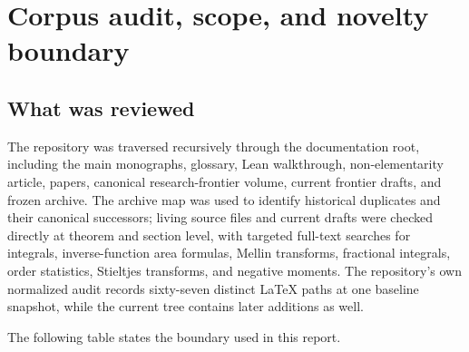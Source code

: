 \documentclass[11pt,oneside]{article}
\theoremstyle{definition}
\theoremstyle{remark}
\newcommand{\1}{\mathbf 1}
\begin{document}
\bigskip

\section{Corpus audit, scope, and novelty boundary}

\subsection{What was reviewed}

The repository was traversed recursively through the documentation root, including the
main monographs, glossary, Lean walkthrough, non-elementarity article, papers, canonical
research-frontier volume, current frontier drafts, and frozen archive.  The archive map
was used to identify historical duplicates and their canonical successors; living source
files and current drafts were checked directly at theorem and section level, with targeted
full-text searches for integrals, inverse-function area formulas, Mellin transforms,
fractional integrals, order statistics, Stieltjes transforms, and negative moments.
The repository's own normalized audit records sixty-seven distinct LaTeX paths at one
baseline snapshot, while the current tree contains later additions as well.

The following table states the boundary used in this report.
\end{document}
